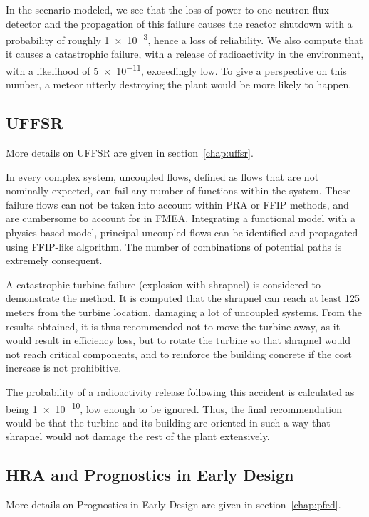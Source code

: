 In the scenario modeled, we see that the loss of power to one neutron flux detector and the propagation of this failure causes the reactor shutdown with a probability of roughly \num{1e-3}, hence a loss of reliability. We also compute that it causes a catastrophic failure, with a release of radioactivity in the environment, with a likelihood of \num{5e-11}, exceedingly low. To give a perspective on this number, a meteor utterly destroying the plant would be more likely to happen.

\subsection{UFFSR}

More details on UFFSR are given in section~\ref{chap:uffsr}.

In every complex system, uncoupled flows, defined as flows that are not nominally expected, can fail any number of functions within the system. These failure flows can not be taken into account within PRA or FFIP methods, and are cumbersome to account for in FMEA. Integrating a functional model with a physics-based model, principal uncoupled flows can be identified and propagated using FFIP-like algorithm. The number of combinations of potential paths is extremely consequent.

A catastrophic turbine failure (explosion with shrapnel) is considered to demonstrate the method. It is computed that the shrapnel can reach at least 125 meters from the turbine location, damaging a lot of uncoupled systems. From the results obtained, it is thus recommended not to move the turbine away, as it would result in efficiency loss, but to rotate the turbine so that shrapnel would not reach critical components, and to reinforce the building concrete if the cost increase is not prohibitive.

The probability of a radioactivity release following this accident is calculated as being \num{1e-10}, low enough to be ignored. Thus, the final recommendation would be that the turbine and its building are oriented in such a way that shrapnel would not damage the rest of the plant extensively.

\subsection{HRA and Prognostics in Early Design}

More details on Prognostics in Early Design are given in section~\ref{chap:pfed}.

